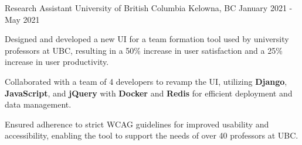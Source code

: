 \begin{cventries}


	\cventry
	{Research Assistant } %
	{University of British Columbia } %
	{Kelowna, BC } %
	{January 2021 - May 2021} %
	{
		\begin{cvitems} %
    \item {Designed and developed a new UI for a team formation tool used by university professors at UBC, resulting in a 50\% increase in user satisfaction and a 25\% increase in user productivity.}
    \item {Collaborated with a team of 4 developers to revamp the UI, utilizing \textbf{Django}, \textbf{JavaScript}, and \textbf{jQuery} with \textbf{Docker} and \textbf{Redis} for efficient deployment and data management.}
    \item {Ensured adherence to strict WCAG guidelines for improved usability and accessibility, enabling the tool to support the needs of over 40 professors at UBC.}
		\end{cvitems}
	}




\end{cventries}
